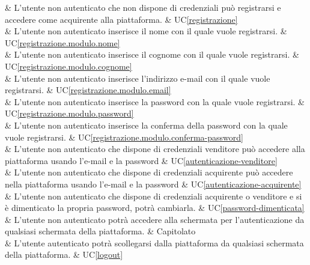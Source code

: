  & L'utente non autenticato che non dispone di credenziali può registrarsi e accedere come acquirente alla piattaforma. & UC\ref{registrazione} \\ 

 & L'utente non autenticato inserisce il nome con il quale vuole registrarsi. & UC\ref{registrazione.modulo.nome} \\

 & L'utente non autenticato inserisce il cognome con il quale vuole registrarsi. & UC\ref{registrazione.modulo.cognome} \\

 & L'utente non autenticato inserisce l'indirizzo e-mail con il quale vuole registrarsi. & UC\ref{registrazione.modulo.email} \\

 & L'utente non autenticato inserisce la password con la quale vuole registrarsi. & UC\ref{registrazione.modulo.password} \\

 & L'utente non autenticato inserisce la conferma della password con la quale vuole registrarsi. & UC\ref{registrazione.modulo.conferma-password} \\

 & L'utente non autenticato che dispone di credenziali venditore può accedere alla piattaforma usando l'e-mail e la password & UC\ref{autenticazione-venditore} \\

 & L'utente non autenticato che dispone di credenziali acquirente può accedere nella piattaforma usando l'e-mail e la password & UC\ref{autenticazione-acquirente} \\

 & L'utente non autenticato che dispone di credenziali acquirente o venditore e si è dimenticato la propria password, potrà cambiarla. & UC\ref{password-dimenticata} \\

 & L'utente non autenticato potrà accedere alla schermata per l'autenticazione da qualsiasi schermata della piattaforma. & Capitolato \\

 & L'utente autenticato potrà scollegarsi dalla piattaforma da qualsiasi schermata della piattaforma. & UC\ref{logout} \\
